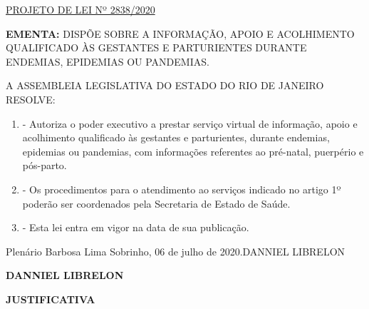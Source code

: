 \documentclass[10pt]{article}
\date{}
\begin{document}
\maketitle
\begin{center}
  \huge
  \vspace{-3cm}\href{http://alerjln1.alerj.rj.gov.br/scpro1923.nsf/f4b46b3cdbba990083256cc900746cf6/22a9b2ea9f05d3d40325859e00557696?OpenDocument}{PROJETO DE LEI Nº 2838/2020}
\bigskip
\bigskip
\bigskip
  
\end{center}

\textbf{EMENTA:} 
DISPÕE SOBRE A INFORMAÇÃO, APOIO E ACOLHIMENTO QUALIFICADO ÀS  GESTANTES E PARTURIENTES DURANTE ENDEMIAS, EPIDEMIAS OU PANDEMIAS.








\bigskip

\noindent
A ASSEMBLEIA LEGISLATIVA DO ESTADO DO RIO DE JANEIRO RESOLVE:

\begin{enumerate}[label=Art. \arabic*\textdegree]
\item - Autoriza o poder executivo a prestar serviço virtual de informação, apoio e acolhimento qualificado às gestantes e parturientes, durante endemias, epidemias ou pandemias, com informações referentes ao pré-natal, puerpério e pós-parto.

\item - Os procedimentos para o atendimento ao serviços indicado no artigo 1º poderão ser coordenados pela Secretaria de Estado de Saúde.

\item - Esta lei entra em vigor na data de sua publicação.

\end{enumerate}




\begin{center}
  Plenário Barbosa Lima Sobrinho, 06 de julho de 2020.DANNIEL LIBRELON

   \bigskip

  \textbf{ DANNIEL LIBRELON}

  \bigskip

  \textbf{JUSTIFICATIVA}
  \bigskip

\end{center}
\end{document}

